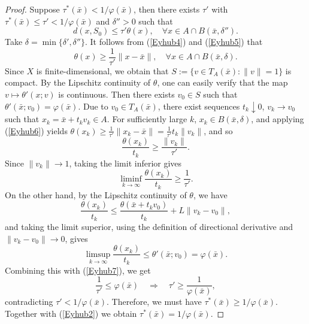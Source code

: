 \documentclass[11pt]{article}
\begin{document}
\begin{proof}
	Suppose $\tau^*(\bar{x}) < 1/	\varphi(\bar{x})$,  then there exists $\tau'$ with $\tau^*(\bar{x}) \le \tau' < 1/	\varphi(\bar{x})$ and $\delta'' > 0$ such that
	\begin{equation}\label{Eyhub5}
		d(x, S_0) \le \tau' \theta(x),   \quad  \forall x \in A \cap B(\bar{x}, \delta'').
	\end{equation}
	Take $\delta = \min\{\delta', \delta ''\}$.  
	It follows from  (\ref{Eyhub4}) and (\ref{Eyhub5})   that
	\begin{equation}\label{Eyhub6}
		\theta(x) \ge \frac{1}{\tau'} \|x - \bar{x}\|,   \quad	\forall  x \in A \cap B(\bar{x}, \delta).
	\end{equation}
	Since $X$ is finite-dimensional, we obtain that  $S := \{v \in T_A(\bar{x}) : \|v\| = 1\}$ is compact. By the Lipschitz continuity of $\theta$,  one can easily verify that   the map $v \mapsto \theta'( x; v)$ is   continuous.  Then there exists  $v_0 \in S$  such that $\theta'(\bar{x}; v_0) = 	\varphi(\bar{x})$.  Due to $v_0 \in  T_A(\bar{x}) $, 
	there exist sequences $t_k \downarrow 0$, $v_k \to v_0$ such that $x_k = \bar{x} + t_k v_k \in A$. For sufficiently large $k$, $x_k \in B(\bar{x}, \delta)$, and applying (\ref{Eyhub6})  yields $\theta(x_k) \ge \frac{1}{\tau'} \|x_k - \bar{x}\| = \frac{1}{\tau'} t_k \|v_k\|$, and so
	\[
	\frac{\theta(x_k)}{t_k} \ge \frac{\|v_k\|}{\tau'}.
	\]
	Since $\|v_k\| \to 1$, taking the limit inferior gives 
	\begin{equation}\label{Eyhub7}
		\liminf_{k \to \infty} \frac{\theta(x_k)}{t_k} \ge \frac{1}{\tau'}.
	\end{equation}
	On the other hand, by the Lipschitz continuity of $\theta$,  we have
	\[
	\frac{\theta(x_k)}{t_k} \le \frac{\theta(\bar{x} + t_k v_0)}{t_k} + L  \|v_k - v_0\|,
	\]
	and taking the limit superior, using the definition of directional derivative and $\|v_k - v_0\| \to 0$, gives
	\[
	\limsup_{k \to \infty} \frac{\theta(x_k)}{t_k} \le \theta'(\bar{x}; v_0) = 	\varphi(\bar{x}).
	\]
	Combining this with  (\ref{Eyhub7}), we get
	\[
	\frac{1}{\tau'} \le 	\varphi(\bar{x}) \quad \Longrightarrow \quad \tau' \ge \frac{1}{	\varphi(\bar{x})},
	\]
	contradicting $\tau' < 1/	\varphi(\bar{x})$.  Therefore, we must have $\tau^*(\bar{x}) \ge 1/	\varphi(\bar{x})$. Together with (\ref{Eyhub2}) we obtain $\tau^*(\bar{x}) = 1/	\varphi(\bar{x})$.
	

\end{proof}
\end{document}
